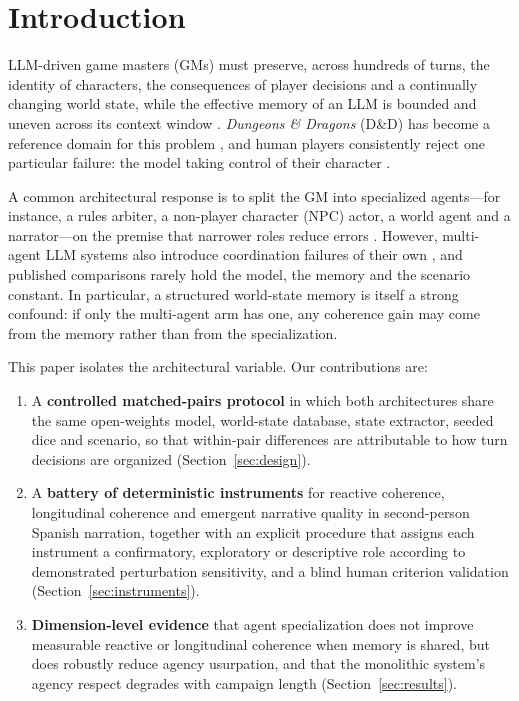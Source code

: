 \documentclass[11pt]{article}
\begin{document}
\section{Introduction}
LLM-driven game masters (GMs) must preserve, across hundreds of turns, the identity of characters, the consequences of player decisions and a continually changing world state, while the effective memory of an LLM is bounded and uneven across its context window \citep{liu2024lost,gallotta2024llms}. \textit{Dungeons \& Dragons} (D\&D) has become a reference domain for this problem \citep{callisonburch2022dnd,zhu2023fireball,zhou2023detect}, and human players consistently reject one particular failure: the model taking control of their character \citep{zhu2023fireball}.

A common architectural response is to split the GM into specialized agents---for instance, a rules arbiter, a non-player character (NPC) actor, a world agent and a narrator---on the premise that narrower roles reduce errors \citep{xia2025storywriter,park2023generative,ware2023multiagent}. However, multi-agent LLM systems also introduce coordination failures of their own \citep{cemri2025why}, and published comparisons rarely hold the model, the memory and the scenario constant. In particular, a structured world-state memory is itself a strong confound: if only the multi-agent arm has one, any coherence gain may come from the memory rather than from the specialization.

This paper isolates the architectural variable. Our contributions are:
\begin{enumerate}
\item A \textbf{controlled matched-pairs protocol} in which both architectures share the same open-weights model, world-state database, state extractor, seeded dice and scenario, so that within-pair differences are attributable to how turn decisions are organized (Section~\ref{sec:design}).
\item A \textbf{battery of deterministic instruments} for reactive coherence, longitudinal coherence and emergent narrative quality in second-person Spanish narration, together with an explicit procedure that assigns each instrument a confirmatory, exploratory or descriptive role according to demonstrated perturbation sensitivity, and a blind human criterion validation (Section~\ref{sec:instruments}).
\item \textbf{Dimension-level evidence} that agent specialization does not improve measurable reactive or longitudinal coherence when memory is shared, but does robustly reduce agency usurpation, and that the monolithic system's agency respect degrades with campaign length (Section~\ref{sec:results}).
\end{enumerate}
\end{document}

